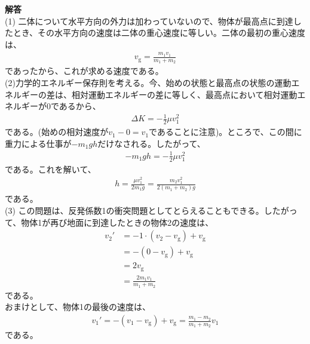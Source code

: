 \documentclass[a4paper,11pt]{jsarticle}
\numberwithin{equation}{section}
\begin{document}
\textbf{解答}\\
(1) 二体について水平方向の外力は加わっていないので、物体が最高点に到達したとき、その水平方向の速度は二体の重心速度に等しい。二体の最初の重心速度は、
\begin{align}
    v_{\text{g}} = \frac{m_1v_1}{m_1 + m_2}
\end{align}
であったから、これが求める速度である。\\
(2)力学的エネルギー保存則を考える。今、始めの状態と最高点の状態の運動エネルギーの差は、相対運動エネルギーの差に等しく、最高点において相対運動エネルギーが0であるから、
\begin{align}
    \Delta K = -\frac{1}{2}\mu v_1^2
\end{align}
である。(始めの相対速度が$v_1-0 = v_1$であることに注意)。ところで、この間に重力による仕事が$-m_1gh$だけなされる。したがって、
\begin{align}
    -m_1gh = -\frac{1}{2}\mu v_1^2
\end{align}
である。これを解いて、
\begin{align}
    h = \frac{\mu v_1^2}{2m_1g} = \frac{m_2v_1^2}{2(m_1 + m_2)g}
\end{align}
である。\\
(3) この問題は、反発係数1の衝突問題としてとらえることもできる。したがって、物体1が再び地面に到達したときの物体2の速度は、
\begin{align}
    v_2' &= -1\cdot(v_2 - v_{\text{g}}) +v_{\text{g}} \\
    &= -(0 - v_{\text{g}}) + v_{\text{g}} \\
    &= 2v_{\text{g}} \\
    &= \frac{2m_1v_1}{m_1 + m_2}
\end{align}
である。\\

おまけとして、物体1の最後の速度は、
\begin{align}
    v_1' = -(v_1 - v_{\text{g}}) + v_{\text{g}} = \frac{m_1-m_2}{m_1+m_2}v_1
\end{align}
である。\\
\end{document}

